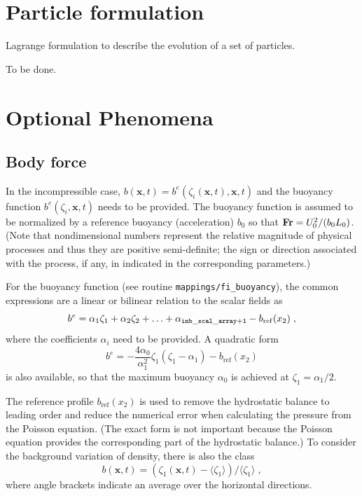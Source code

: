 \section{Particle formulation}

Lagrange formulation to describe the evolution of a set of particles.

To be done.

\section{Optional Phenomena}

\subsection{Body force}

In the incompressible case, $b(\mathbf{x},t)=b^e(\zeta_i(\mathbf{x},t),\mathbf{x},t)$ and the buoyancy function $b^e(\zeta_i,\mathbf{x},t)$ needs to be provided. The buoyancy function is assumed to be normalized by a reference buoyancy (acceleration) $b_0$ so that $\mathrm{\bf Fr}=U_0^2/(b_0L_0)$. (Note that nondimensional numbers represent the relative magnitude of physical processes and thus they are positive semi-definite; the sign or direction associated with the process, if any, in indicated in the corresponding parameters.)

For the buoyancy function (see routine {\tt mappings/fi\_buoyancy}), the common expressions are a linear or bilinear relation to the scalar fields as
\begin{equation}
    b^e=\alpha_1\zeta_1+\alpha_2\zeta_2+\ldots+\alpha_\mathrm{\tt inb\_scal\_array+1} -b_\mathrm{ref}(x_2)\;,
\end{equation}
where the coefficients $\alpha_i$ need to be provided. A quadratic form
\begin{equation}
    b^e=-\frac{4\alpha_0}{\alpha_1^2}\zeta_1(\zeta_1-\alpha_1) -b_\mathrm{ref}(x_2)
\end{equation}
is also available, so that the maximum buoyancy $\alpha_0$ is achieved at
$\zeta_1=\alpha_1/2$.

The reference profile $b_\mathrm{ref}(x_2)$ is used to remove the hydrostatic balance to leading order and reduce the numerical error when calculating the pressure from the Poisson equation. (The exact form is not important because the Poisson equation provides the corresponding part of the hydrostatic balance.) To consider the background variation of density, there is also the class
\begin{equation}
    b(\mathbf{x},t)=(\zeta_1(\mathbf{x},t)-\langle \zeta_1\rangle)/\langle \zeta_1\rangle \;,
\end{equation}
where angle brackets indicate an average over the horizontal directions.



